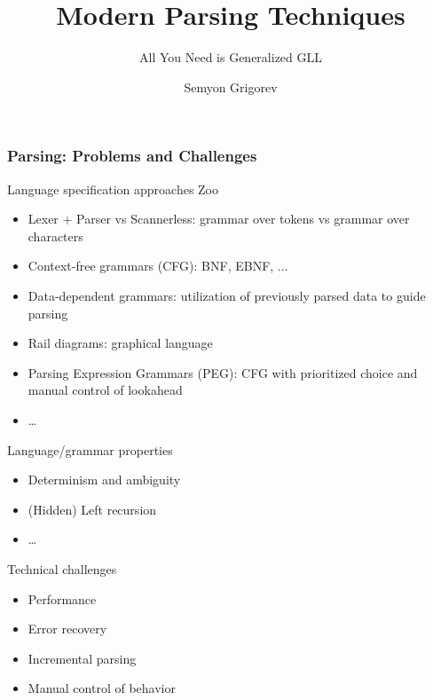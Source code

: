 \documentclass[xcolor=table,aspectratio=169]{beamer}
\title[Modern Parsing Techniques]{Modern Parsing Techniques}
\subtitle{All You Need is Generalized GLL}
\author[Semyon Grigorev]{Semyon Grigorev}
\begin{document}
{
\begin{frame}[fragile]
  \titlepage
\end{frame}
}




\begin{frame}[fragile]
  \frametitle{Parsing: Problems and Challenges}  
  \begin{minipage}[t]{0.49\textwidth}
    Language specification approaches Zoo
    \begin{itemize}
      \item Lexer + Parser vs Scannerless: grammar over tokens vs grammar over characters 
      \item Context-free grammars (CFG): BNF, EBNF, ...      
      \item Data-dependent grammars: utilization of previously parsed data to guide parsing
      \item Rail diagrams: graphical language
      \item Parsing Expression Grammars (PEG): CFG with prioritized choice and manual control of lookahead  
      \item \ldots
    \end{itemize}
  \end{minipage}  
  \begin{minipage}[t]{0.49\textwidth}
    Language/grammar properties
    \begin{itemize}
      \item Determinism and ambiguity
      \item (Hidden) Left recursion
      \item \ldots
    \end{itemize}
    Technical challenges
    \begin{itemize}
      \item Performance
      \item Error recovery
      \item Incremental parsing
      \item Manual control of behavior
    \end{itemize}
  \end{minipage}
\end{frame}
\end{document}
